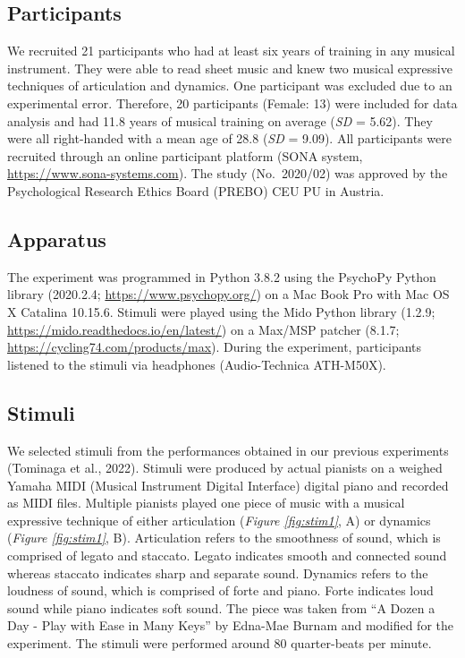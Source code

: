 \documentclass[
  man,floatsintext]{apa6}
\begin{document}
\hypertarget{participants}{%
\subsection{Participants}\label{participants}}

We recruited 21 participants who had at least six years of training in any musical instrument. They were able to read sheet music and knew two musical expressive techniques of articulation and dynamics. One participant was excluded due to an experimental error. Therefore, 20 participants (Female: 13) were included for data analysis and had 11.8 years of musical training on average (\emph{SD} = 5.62). They were all right-handed with a mean age of 28.8 (\emph{SD} = 9.09). All participants were recruited through an online participant platform (SONA system, \url{https://www.sona-systems.com}). The study (No.~2020/02) was approved by the Psychological Research Ethics Board (PREBO) CEU PU in Austria.

\hypertarget{apparatus}{%
\subsection{Apparatus}\label{apparatus}}

The experiment was programmed in Python 3.8.2 using the PsychoPy Python library (2020.2.4; \url{https://www.psychopy.org/}) on a Mac Book Pro with Mac OS X Catalina 10.15.6. Stimuli were played using the Mido Python library (1.2.9; \url{https://mido.readthedocs.io/en/latest/}) on a Max/MSP patcher (8.1.7; \url{https://cycling74.com/products/max}). During the experiment, participants listened to the stimuli via headphones (Audio-Technica ATH-M50X).

\hypertarget{stimuli}{%
\subsection{Stimuli}\label{stimuli}}

We selected stimuli from the performances obtained in our previous experiments (Tominaga et al., 2022). Stimuli were produced by actual pianists on a weighed Yamaha MIDI (Musical Instrument Digital Interface) digital piano and recorded as MIDI files. Multiple pianists played one piece of music with a musical expressive technique of either articulation (\emph{Figure \ref{fig:stim1}}, A) or dynamics (\emph{Figure \ref{fig:stim1}}, B). Articulation refers to the smoothness of sound, which is comprised of legato and staccato. Legato indicates smooth and connected sound whereas staccato indicates sharp and separate sound. Dynamics refers to the loudness of sound, which is comprised of forte and piano. Forte indicates loud sound while piano indicates soft sound. The piece was taken from ``A Dozen a Day - Play with Ease in Many Keys'' by Edna-Mae Burnam and modified for the experiment. The stimuli were performed around 80 quarter-beats per minute.
\end{document}
